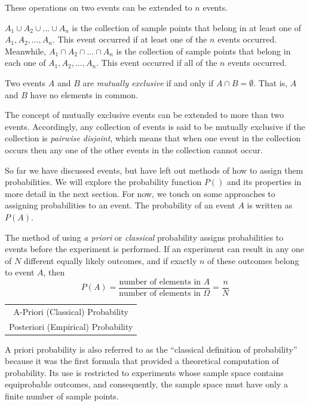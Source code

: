 \documentclass{article}
\begin{document}
These operations on two events can be extended to $n$ events.

$A_1 \cup A_2 \cup ... \cup A_n$ is the collection of sample points that belong in at least one of $A_1, A_2, ..., A_n$. This event occurred if at least one of the $n$ events occurred. Meanwhile, $A_1 \cap A_2 \cap ... \cap A_n$ is the collection of sample points that belong in each one of $A_1, A_2, ..., A_n$. This event occurred if all of the $n$ events occurred.

Two events $A$ and $B$ are \emph{mutually exclusive} if and only if $A \cap B = \emptyset$. That is, $A$ and $B$ have no elements in common.

The concept of mutually exclusive events can be extended to more than two events.  Accordingly, any collection of events is said to be mutually exclusive if the collection is \emph{pairwise disjoint}, which means that when one event in the collection occurs then any one of the other events in the collection cannot occur.

So far we have discussed events, but have left out methods of how to assign them probabilities. We will explore the probability function $P()$ and its properties in more detail in the next section. For now, we touch on some approaches to assigning probabilities to an event. The probability of an event $A$ is written as $P(A)$.

The method of using \emph{a priori}  or \emph{classical} probability assigns probabilities to events before the experiment is performed.
If an experiment can result in any one of $N$ different equally likely outcomes, and if exactly $n$ of these outcomes belong to event $A$, then
$$
P(A)=\frac{\text{number of elements in } A}{\text{number of elements in } \Omega} = \frac{n}{N}
$$

\begin{margintable}
\begin{tabular}{c} 
    A-Priori (Classical) Probability \\
    Posteriori (Empirical) Probability
\end{tabular}
\end{margintable}

A priori probability is also referred to as the “classical definition of probability” because it was the first formula that provided a theoretical computation of probability. Its use is restricted to experiments whose sample space contains equiprobable outcomes, and consequently, the sample space must have only a finite number of sample points.
\end{document}
